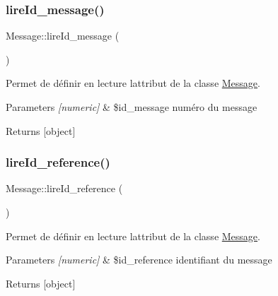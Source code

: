 \subsubsection{\texorpdfstring{lire\+Id\+\_\+message()}{lireId\_message()}}
{\footnotesize\ttfamily Message\+::lire\+Id\+\_\+message (\begin{DoxyParamCaption}{ }\end{DoxyParamCaption})}



Permet de définir en lecture l\textquotesingle{}attribut de la classe \hyperlink{class_message}{Message}. 


\begin{DoxyParams}{Parameters}
{\em \mbox{[}numeric\mbox{]}} & \$id\+\_\+message numéro du message \\
\hline
\end{DoxyParams}
\begin{DoxyReturn}{Returns}
\mbox{[}object\mbox{]} 
\end{DoxyReturn}
\mbox{\label{class_message_a92dea15765c2e4e8a4da385940a2d9ef}} 
\subsubsection{\texorpdfstring{lire\+Id\+\_\+reference()}{lireId\_reference()}}
{\footnotesize\ttfamily Message\+::lire\+Id\+\_\+reference (\begin{DoxyParamCaption}{ }\end{DoxyParamCaption})}



Permet de définir en lecture l\textquotesingle{}attribut de la classe \hyperlink{class_message}{Message}. 


\begin{DoxyParams}{Parameters}
{\em \mbox{[}numeric\mbox{]}} & \$id\+\_\+reference identifiant du message \\
\hline
\end{DoxyParams}
\begin{DoxyReturn}{Returns}
\mbox{[}object\mbox{]} 
\end{DoxyReturn}
\mbox{\label{class_message_a009389efe8aa3dcf62a862b2a1bec69d}} 
